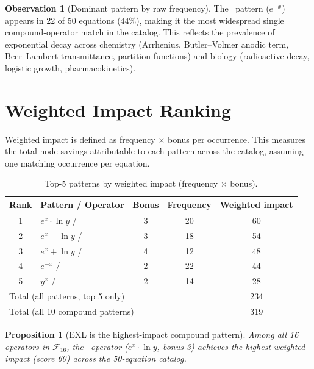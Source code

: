 \documentclass[12pt,a4paper]{article}
\newtheorem{proposition}[theorem]{Proposition}
\theoremstyle{definition}
\newtheorem{observation}[theorem]{Observation}
\newcommand{\EML}{\operatorname{EML}}
\newcommand{\EXL}{\operatorname{EXL}}
\newcommand{\EAL}{\operatorname{EAL}}
\newcommand{\DEML}{\operatorname{DEML}}
\newcommand{\EPL}{\operatorname{EPL}}
\begin{document}
\begin{observation}[Dominant pattern by raw frequency]
\label{obs:freq}
The \DEML\ pattern ($e^{-x}$) appears in 22 of 50 equations (44\%),
making it the most widespread single compound-operator match in the catalog.
This reflects the prevalence of exponential decay across chemistry (Arrhenius,
Butler--Volmer anodic term, Beer--Lambert transmittance, partition functions)
and biology (radioactive decay, logistic growth, pharmacokinetics).
\end{observation}

\section{Weighted Impact Ranking}
\label{sec:ranking}

Weighted impact is defined as frequency $\times$ bonus per occurrence.
This measures the total node savings attributable to each pattern across
the catalog, assuming one matching occurrence per equation.

\begin{table}[h]
\centering
\caption{Top-5 patterns by weighted impact (frequency $\times$ bonus).}
\label{tab:top5}
\smallskip
\begin{tabular}{@{}clccc@{}}
\toprule
\textbf{Rank} & \textbf{Pattern / Operator} & \textbf{Bonus} & \textbf{Frequency} & \textbf{Weighted impact} \\
\midrule
1 & $e^x \cdot \ln y$ / \EXL  & 3 & 20 & 60 \\
2 & $e^x - \ln y$ / \EML      & 3 & 18 & 54 \\
3 & $e^x + \ln y$ / \EAL      & 4 & 12 & 48 \\
4 & $e^{-x}$ / \DEML           & 2 & 22 & 44 \\
5 & $y^x$ / \EPL               & 2 & 14 & 28 \\
\midrule
\multicolumn{3}{l}{Total (all patterns, top 5 only)} & & 234 \\
\multicolumn{3}{l}{Total (all 10 compound patterns)} & & 319 \\
\bottomrule
\end{tabular}
\end{table}

\begin{proposition}[EXL is the highest-impact compound pattern]
\label{prop:top}
Among all 16 operators in $\mathcal{F}_{16}$, the \EXL\ operator
($e^x \cdot \ln y$, bonus 3) achieves the highest weighted impact
(score 60) across the 50-equation catalog.
\end{proposition}
\end{document}
